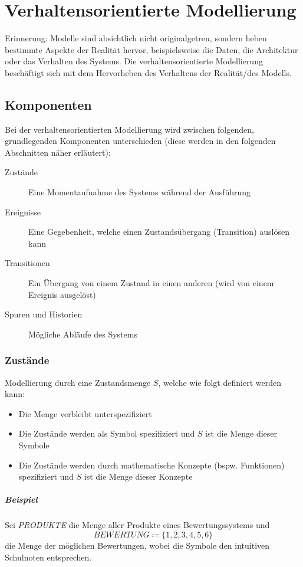 \documentclass[a4paper, 11pt, accentcolor = tud3b]{tudreport}
\begin{document}
    \chapter{Verhaltensorientierte Modellierung}
	    Erinnerung: Modelle sind absichtlich nicht originalgetreu, sondern heben bestimmte Aspekte der Realität hervor, beispielsweise die Daten, die Architektur oder das Verhalten des Systems. Die verhaltensorientierte Modellierung beschäftigt sich mit dem Hervorheben des Verhaltens der Realität/des Modells.
    
	    \section{Komponenten}
		    Bei der verhaltensorientierten Modellierung wird zwischen folgenden, grundlegenden Komponenten unterschieden (diese werden in den folgenden Abschnitten näher erläutert):
		    \begin{description}
		    	\item[Zustände] Eine Momentaufnahme des Systems während der Ausführung
		    	\item[Ereignisse] Eine Gegebenheit, welche einen Zustandsübergang (Transition) auslösen kann
		    	\item[Transitionen] Ein Übergang von einem Zustand in einen anderen (wird von einem Ereignis ausgelöst)
		    	\item[Spuren und Historien] Mögliche Abläufe des Systems
		    \end{description}
		    
		    \subsection{Zustände}
				Modellierung durch eine Zustandsmenge $ S $, welche wie folgt definiert werden kann:
				\begin{itemize}
					\item Die Menge verbleibt unterspezifiziert
					\item Die Zustände werden als Symbol spezifiziert und $ S $ ist die Menge dieser Symbole
					\item Die Zustände werden durch mathematische Konzepte (bspw. Funktionen) spezifiziert und $ S $ ist die Menge dieser Konzepte
				\end{itemize}
				
				\paragraph{Beispiel}
					Sei \textit{PRODUKTE} die Menge aller Produkte eines Bewertungssystems und \[ \textit{BEWERTUNG} \coloneqq \{ 1, 2, 3, 4, 5, 6 \} \] die Menge der möglichen Bewertungen, wobei die Symbole den intuitiven Schulnoten entsprechen.
					
\end{document}
